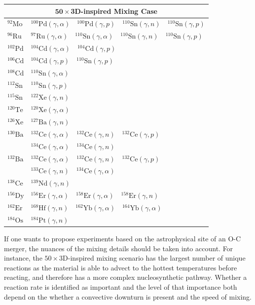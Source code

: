 \begin{table}
\begin{tabular}{l|l}
    \midrule
    \multicolumn{2}{c}{$\mathbf{50\times}$\textbf{3D-inspired Mixing Case}} \\
    \midrule
    $^{92}\mathrm{Mo}$ & $^{100}\mathrm{Pd}(\gamma,\alpha)$~~$^{100}\mathrm{Pd}(\gamma,p)$~~$^{110}\mathrm{Sn}(\gamma,n)$~~$^{110}\mathrm{Sn}(\gamma,p)$ \\
    $^{96}\mathrm{Ru}$ & $^{97}\mathrm{Ru}(\gamma,\alpha)$~~$^{110}\mathrm{Sn}(\gamma,\alpha)$~~$^{110}\mathrm{Sn}(\gamma,n)$~~$^{110}\mathrm{Sn}(\gamma,p)$ \\
    $^{102}\mathrm{Pd}$ & $^{104}\mathrm{Cd}(\gamma,\alpha)$~~$^{104}\mathrm{Cd}(\gamma,p)$ \\
    $^{106}\mathrm{Cd}$ & $^{104}\mathrm{Cd}(\gamma,p)$~~$^{110}\mathrm{Sn}(\gamma,p)$ \\
    $^{108}\mathrm{Cd}$ & $^{110}\mathrm{Sn}(\gamma,\alpha)$ \\
    $^{112}\mathrm{Sn}$ & $^{110}\mathrm{Sn}(\gamma,p)$ \\
    $^{115}\mathrm{Sn}$ & $^{122}\mathrm{Xe}(\gamma,n)$ \\
    $^{120}\mathrm{Te}$ & $^{120}\mathrm{Xe}(\gamma,\alpha)$ \\
    $^{126}\mathrm{Xe}$ & $^{127}\mathrm{Ba}(\gamma,n)$ \\
    $^{130}\mathrm{Ba}$ & $^{132}\mathrm{Ce}(\gamma,\alpha)$~~$^{132}\mathrm{Ce}(\gamma,n)$~~$^{132}\mathrm{Ce}(\gamma,p)$\\
    &$^{134}\mathrm{Ce}(\gamma,\alpha)$~~$^{134}\mathrm{Ce}(\gamma,n)$ \\
    $^{132}\mathrm{Ba}$ & $^{132}\mathrm{Ce}(\gamma,\alpha)$~~$^{132}\mathrm{Ce}(\gamma,n)$~~$^{132}\mathrm{Ce}(\gamma,p)$\\
    & $^{133}\mathrm{Ce}(\gamma,n)$~~$^{134}\mathrm{Ce}(\gamma,\alpha)$ \\
    $^{138}\mathrm{Ce}$ & $^{139}\mathrm{Nd}(\gamma,n)$ \\
    $^{156}\mathrm{Dy}$ & $^{156}\mathrm{Er}(\gamma,\alpha)$~~$^{158}\mathrm{Er}(\gamma,\alpha)$~~$^{158}\mathrm{Er}(\gamma,n)$ \\
    $^{162}\mathrm{Er}$ & $^{168}\mathrm{Hf}(\gamma,n)$~~$^{162}\mathrm{Yb}(\gamma,\alpha)$~~$^{164}\mathrm{Yb}(\gamma,\alpha)$ \\
    $^{184}\mathrm{Os}$ & $^{184}\mathrm{Pt}(\gamma,n)$ \\
    \toprule
\end{tabular}
\end{table}

If one wants to propose experiments based on the astrophysical site of an O-C merger, the nuances of the mixing details should be taken into account.
For instance, the $50\times$3D-inspired mixing scenario has the largest number of unique reactions as the material is able to advect to the hottest temperatures before reacting, and therefore has a more complex nucleosynthetic pathway.
Whether a reaction rate is identified as important and the level of that importance both depend on the whether a convective downturn is present and the speed of mixing.


